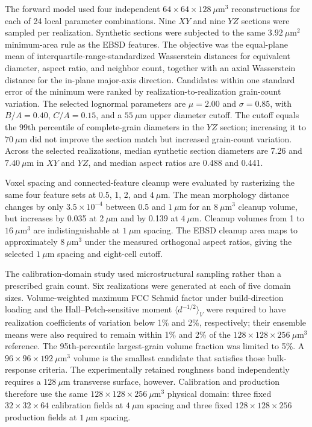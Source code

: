 \documentclass[final,12pt]{cas-sc}
\begin{document}
The forward model used four independent $64\times64\times128~\mu\mathrm{m}^3$ reconstructions for each of 24 local parameter combinations. Nine $XY$ and nine $YZ$ sections were sampled per realization. Synthetic sections were subjected to the same $3.92~\mu\mathrm{m}^2$ minimum-area rule as the EBSD features. The objective was the equal-plane mean of interquartile-range-standardized Wasserstein distances for equivalent diameter, aspect ratio, and neighbor count, together with an axial Wasserstein distance for the in-plane major-axis direction. Candidates within one standard error of the minimum were ranked by realization-to-realization grain-count variation. The selected lognormal parameters are $\mu=2.00$ and $\sigma=0.85$, with $B/A=0.40$, $C/A=0.15$, and a $55~\mu$m upper diameter cutoff. The cutoff equals the 99th percentile of complete-grain diameters in the $YZ$ section; increasing it to $70~\mu$m did not improve the section match but increased grain-count variation. Across the selected realizations, median synthetic section diameters are 7.26 and $7.40~\mu$m in $XY$ and $YZ$, and median aspect ratios are 0.488 and 0.441.

Voxel spacing and connected-feature cleanup were evaluated by rasterizing the same four feature sets at 0.5, 1, 2, and $4~\mu$m. The mean morphology distance changes by only $3.5\times10^{-4}$ between 0.5 and $1~\mu$m for an $8~\mu\mathrm{m}^3$ cleanup volume, but increases by 0.035 at $2~\mu$m and by 0.139 at $4~\mu$m. Cleanup volumes from 1 to $16~\mu\mathrm{m}^3$ are indistinguishable at $1~\mu$m spacing. The EBSD cleanup area maps to approximately $8~\mu\mathrm{m}^3$ under the measured orthogonal aspect ratios, giving the selected $1~\mu$m spacing and eight-cell cutoff.

The calibration-domain study used microstructural sampling rather than a
prescribed grain count. Six realizations were generated at each of five
domain sizes. Volume-weighted maximum FCC Schmid factor under build-direction
loading and the Hall--Petch-sensitive moment
$\langle d^{-1/2}\rangle_V$ were required to have realization coefficients
of variation below 1\% and 2\%, respectively; their ensemble means were also
required to remain within 1\% and 2\% of the
$128\times128\times256~\mu\mathrm{m}^3$ reference. The 95th-percentile
largest-grain volume fraction was limited to 5\%. A
$96\times96\times192~\mu\mathrm{m}^3$ volume is the smallest candidate that
satisfies those bulk-response criteria. The experimentally retained roughness
band independently requires a $128~\mu$m transverse surface, however.
Calibration and production therefore use the same
$128\times128\times256~\mu\mathrm{m}^3$ physical domain: three fixed
$32\times32\times64$ calibration fields at $4~\mu$m spacing and three fixed
$128\times128\times256$ production fields at $1~\mu$m spacing.
\end{document}
